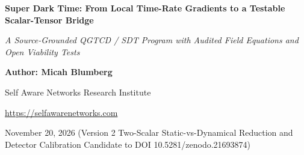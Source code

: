\documentclass[
  american,
  11pt,
  letterpaper,
]{article}
\author{}
\date{}
\begin{document}
\begin{center}

{\LARGE\bfseries Super Dark Time: From Local Time-Rate Gradients to a Testable Scalar-Tensor Bridge\par}

\vspace{0.35em}

{\large\itshape A Source-Grounded QGTCD / SDT Program with Audited Field Equations and Open Viability Tests\par}

\vspace{0.8em}

{\small\textbf{Author: Micah Blumberg}\par}

{\small Self Aware Networks Research Institute\par}

{\small\url{https://selfawarenetworks.com}\par}

{\small November 20, 2026 (Version 2 Two-Scalar Static-vs-Dynamical Reduction and Detector Calibration Candidate to DOI 10.5281/zenodo.21693874)\par}

\end{center}

\vspace{0.65em}
\end{document}
